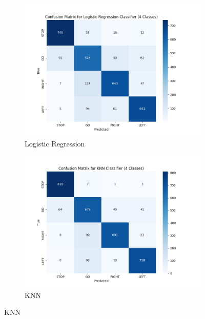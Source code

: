 \begin{figure}[h]
\centering
\begin{subfigure}{0.49\textwidth}
    \includegraphics[width=\linewidth]{img/classifier/logistic_regression_confucion_matrix.png}
    \caption{Logistic Regression}
\end{subfigure}
\begin{subfigure}{0.49\textwidth}
    \includegraphics[width=\linewidth]{img/classifier/KNN_confucion_matrix.png}
    \caption{KNN}
\end{subfigure}

\vspace{0.5em}


\end{figure}
